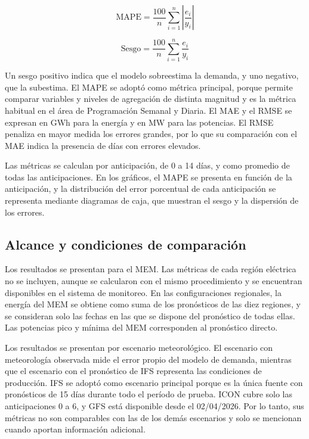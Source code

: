 \begin{equation}
	\mathrm{MAPE} = \frac{100}{n} \sum_{i=1}^{n} \left| \frac{e_i}{y_i} \right|
	\label{eq:mape}
\end{equation}

\begin{equation}
	\mathrm{Sesgo} = \frac{100}{n} \sum_{i=1}^{n} \frac{e_i}{y_i}
	\label{eq:sesgo}
\end{equation}

Un sesgo positivo indica que el modelo sobreestima la demanda, y uno negativo, que la subestima. El MAPE se adoptó como métrica principal, porque permite comparar variables y niveles de agregación de distinta magnitud y es la métrica habitual en el área de Programación Semanal y Diaria. El MAE y el RMSE se expresan en GWh para la energía y en MW para las potencias. El RMSE penaliza en mayor medida los errores grandes, por lo que su comparación con el MAE indica la presencia de días con errores elevados.

Las métricas se calculan por anticipación, de 0 a 14 días, y como promedio de todas las anticipaciones. En los gráficos, el MAPE se presenta en función de la anticipación, y la distribución del error porcentual de cada anticipación se representa mediante diagramas de caja, que muestran el sesgo y la dispersión de los errores.

\subsection{Alcance y condiciones de comparación}
\label{subsec:condiciones_comparacion}

Los resultados se presentan para el MEM. Las métricas de cada región eléctrica no se incluyen, aunque se calcularon con el mismo procedimiento y se encuentran disponibles en el sistema de monitoreo. En las configuraciones regionales, la energía del MEM se obtiene como suma de los pronósticos de las diez regiones, y se consideran solo las fechas en las que se dispone del pronóstico de todas ellas. Las potencias pico y mínima del MEM corresponden al pronóstico directo.

Los resultados se presentan por escenario meteorológico. El escenario con meteorología observada mide el error propio del modelo de demanda, mientras que el escenario con el pronóstico de IFS representa las condiciones de producción. IFS se adoptó como escenario principal porque es la única fuente con pronósticos de 15 días durante todo el período de prueba. ICON cubre solo las anticipaciones 0 a 6, y GFS está disponible desde el 02/04/2026. Por lo tanto, sus métricas no son comparables con las de los demás escenarios y solo se mencionan cuando aportan información adicional.

